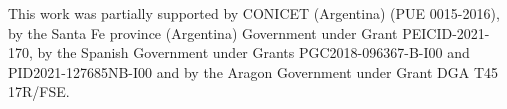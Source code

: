 This work was partially supported by CONICET (Argentina) (PUE 0015-2016), by the Santa Fe province (Argentina) Government under Grant PEICID-2021-170, by the Spanish Government under Grants PGC2018-096367-B-I00 and
PID2021-127685NB-I00 and by the Aragon Government under Grant DGA T45 17R/FSE.